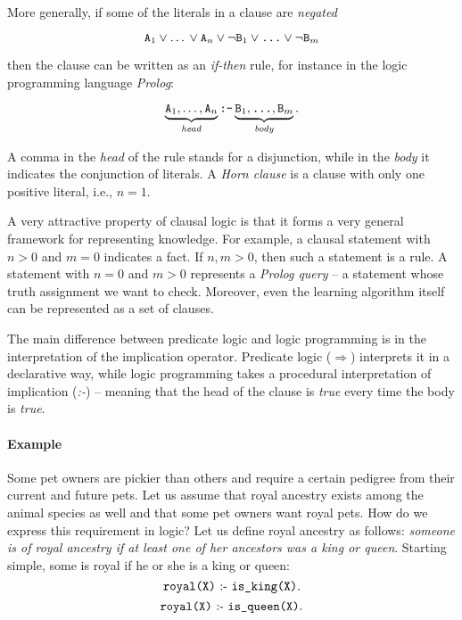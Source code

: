 More generally, if some of the literals in a clause are \textit{negated}

$$ \text{\texttt{A}}_1 \vee \text{\ldots} \vee \text{\texttt{A}}_n \vee \neg \text{\texttt{B}}_1 \vee \text{\texttt{\ldots}} \vee \neg \text{\texttt{B}}_m$$

then the clause can be written as an \textit{if-then} rule, for instance in the logic programming language \textit{Prolog}:

$$ \underbrace{\text{\texttt{A}}_1, \text{\ldots}, \text{\texttt{A}}_n}_{\text{\textit{head}}} \text{\texttt{:-}} \underbrace{\text{\texttt{B}}_1, \text{\texttt{\ldots}}, \text{\texttt{B}}_m}_{\text{\textit{body}}}.$$

A comma in the \textit{head} of the rule stands for a disjunction, while in the \textit{body} it indicates the conjunction of literals.
A \textit{Horn clause} is a clause with only one positive literal, i.e., $n = 1$.



A very attractive property of clausal logic is that it forms a very general framework for representing knowledge.
For example, a clausal statement with $n > 0$ and $m = 0$ indicates a fact.
If $n, m > 0$, then such a statement is a rule.
A statement with $n=0$ and $m > 0$ represents a \textit{Prolog query} -- a statement whose truth assignment we want to check.
Moreover, even the learning algorithm itself can be represented as a set of clauses.



The main difference between predicate logic and logic programming is in the interpretation of the implication operator.
Predicate logic ($\Rightarrow$) interprets it in a declarative way, while logic programming takes a procedural interpretation of implication (\textit{:-}) -- meaning that the head of the clause is \textit{true} every time the body is \textit{true}.



\paragraph{Example}
Some pet owners are pickier than others and require a certain pedigree from their current and future pets.
Let us assume that royal ancestry exists among the animal species as well and that some pet owners want royal pets.
How do we express this requirement in logic?
Let us define royal ancestry as follows: \textit{someone is of royal ancestry if at least one of her ancestors was a king or queen}.
Starting simple, some is royal if he or she is a king or queen:
$$ \text{\texttt{royal(X)}} \text{ :- } \text{\texttt{is\_king(X)}}.$$
$$ \text{\texttt{royal(X)}} \text{ :- } \text{\texttt{is\_queen(X)}}.$$

